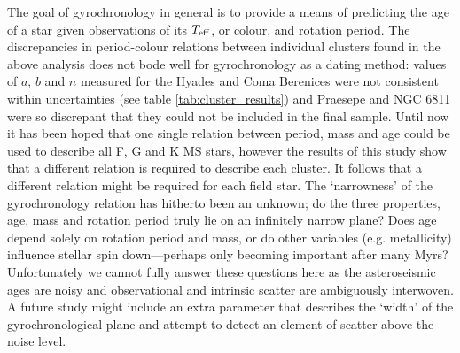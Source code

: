 \documentclass[10pt,preprint]{aastex}
\newcommand{\teff}{$T_{\rm{eff}}$}
\begin{document}

The goal of gyrochronology in general is to provide a means of predicting the age of a star given observations of its \teff, or colour, and rotation period.
The discrepancies in period-colour relations between individual clusters found in the above analysis does not bode well for gyrochronology as a dating method: values of $a$, $b$ and $n$ measured for the Hyades and Coma Berenices were not consistent within uncertainties (see table \ref{tab:cluster_results}) and Praesepe and NGC 6811 were so discrepant that they could not be included in the final sample.
Until now it has been hoped that one single relation between period, mass and age could be used to describe all F, G and K MS stars, however the results of this study show that a different relation is required to describe each cluster.
It follows that a different relation might be required for each field star.
The `narrowness' of the gyrochronology relation has hitherto been an unknown; do the three properties, age, mass and rotation period truly lie on an infinitely narrow plane?
Does age depend solely on rotation period and mass, or do other variables (e.g. metallicity) influence stellar spin down---perhaps only becoming important after many Myrs?
Unfortunately we cannot fully answer these questions here as the asteroseismic ages are noisy and observational and intrinsic scatter are ambiguously interwoven.
A future study might include an extra parameter that describes the `width' of the gyrochronological plane and attempt to detect an element of scatter above the noise level.
\end{document}
